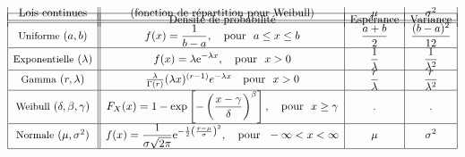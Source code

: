 \documentclass[12pt,french]{article}
\begin{document}
\begin{displaymath}
{\begin{array}{|c||c|c|c|}
\hline
& \mbox{Densit\'e de probabilit\'e}  & \mbox{Esp\'erance} & \mbox{Variance} \\[-18pt]
\mbox{Lois continues} & \mbox{(fonction de r\'epartition pour Weibull)} & \mu  & \sigma^2 \\
\hline \hline \mbox{\small Uniforme}~(a,b)& \displaystyle f(x) =
\frac{1}{b - a},~~~\mbox{pour}~~a \le x \le b &
\displaystyle \frac{a + b}{2}& \displaystyle \frac{(b - a)^2}{12}\\[.10cm]
\hline
\mbox{\small Exponentielle}~(\lambda)&\displaystyle
f(x) = \lambda \mbox{e}^{-\lambda x},~~~\mbox{pour}~~x > 0 & \displaystyle
\frac{1}{\lambda}& \displaystyle \frac{1}{\lambda^{2}}\\[.10cm]
\hline \mbox{\small Gamma}~(r,\lambda)& \frac{\lambda}{\Gamma(r)}(\lambda x)^{(r-1)}e^{-\lambda x} ~~~\mbox{pour}~~x > 0&
\displaystyle
\frac{r}{\lambda}& \displaystyle \frac{r}{\lambda^{2}}\\[.10cm]
\hline \mbox{\small Weibull}~(\delta, \beta, \gamma)&\displaystyle
F_X(x) = 1-\exp\left[- \left (\frac{x-\gamma}{\delta} \right
)^{\beta} \right],~~~\mbox{pour}~~x \geq \gamma & \displaystyle
. & \displaystyle . \\[.10cm]
\hline
\mbox{\small
Normale}~(\mu,\sigma^2)&\displaystyle f(x) = \frac{1}{\sigma
\sqrt{2\pi} } \mbox{e}^{-\frac12
\left(\frac{x-\mu}{\sigma}\right)^2},~~~\mbox{pour}~~-\infty < x <
\infty & \displaystyle
\mu & \displaystyle \sigma^2 \\[.10cm]
\hline
\end{array}}
\end{displaymath}
\end{document}
